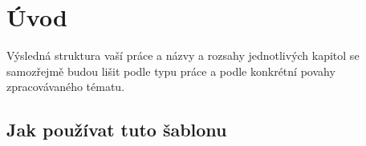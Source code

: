 \chapter{Úvod}
Výsledná struktura vaší práce a názvy a rozsahy jednotlivých kapitol se samozřejmě budou lišit podle typu práce a podle konkrétní povahy zpracovávaného tématu. 

\section{Jak používat tuto šablonu}